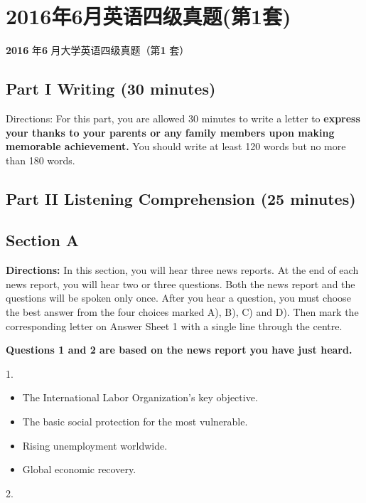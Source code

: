 \documentclass[UTF8,11pt]{ctexart}
\begin{document}
\section*{2016年6月英语四级真题(第1套)}
\textbf{2016} 年\textbf{6} 月大学英语四级真题（第\textbf{1} 套）


\subsection*{\textbf{Part I} \textbf{Writing} \textbf{(30 minutes)}}


Directions: For this part, you are allowed 30 minutes to write a letter to\textbf{ express your thanks to your parents or any} \textbf{family members upon making memorable achievement.} You should write at least 120 words but no more than 180 words.


\subsection*{\textbf{Part} II \textbf{Listening Comprehension} \textbf{(25 minutes)}}


\subsection*{\textbf{Section A}}


\textbf{Directions:} In this section, you will hear three news reports. At the end of each news report, you will hear two or three questions. Both the news report and the questions will be spoken only once. After you hear a question, you must choose the best answer from the four choices marked A), B), C) and D). Then mark the corresponding letter on Answer Sheet 1 with a single line through the centre.


\textbf{Questions 1 and 2 are based on the news report you have just heard.}


1.


\begin{itemize}[leftmargin=2em,itemsep=.2em,topsep=.4em]\item[A.] The International Labor Organization's key objective.
\item[B.] The basic social protection for the most vulnerable.
\item[C.] Rising unemployment worldwide.
\item[D.] Global economic recovery.
\end{itemize}

2.
\end{document}
